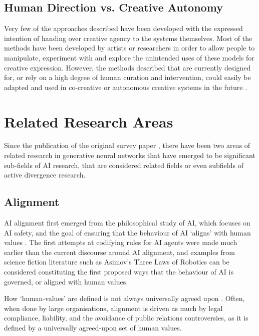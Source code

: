 \subsection{Human Direction vs. Creative Autonomy}
Very few of the approaches described have been developed with the expressed intention of handing over creative agency to the systems themselves. Most of the methods have been developed by artists or researchers in order to allow people to manipulate, experiment with and explore the unintended uses of these models for creative expression. However, the methods described that are currently designed for, or rely on a high degree of human curation and intervention, could easily be adapted and used in co-creative or autonomous creative systems in the future \citep{berns2021automating}.

\section{Related Research Areas}
\label{c6:sec:related-research}

Since the publication of the original survey paper \citep{broad2021active}, there have been two areas of related research in generative neural networks that have emerged to be significant sub-fields of AI research, that are considered related fields or even subfields of active divergence research. 

\subsection{Alignment}
\label{c6:subsec:alignment}

AI alignment first emerged from the philosophical study of AI, which focuses on AI safety, and the goal of ensuring that the behaviour of AI `aligns' with human values \citep{yudkowsky2016ai, gabriel2020artificial}. 
The first attempts at codifying rules for AI agents were made much earlier than the current discourse around AI alignment, and examples from science fiction literature such as Asimov's Three Laws of Robotics \citep{asimov1942runaround} can be considered constituting the first proposed ways that the behaviour of AI is governed, or aligned with human values. 

How `human-values' are defined is not always universally agreed upon \citep{turchin2019ai}. 
Often, when done by large organisations, alignment is driven as much by legal compliance, liability, and the avoidance of public relations controversies, as it is defined by a universally agreed-upon set of human values. 

